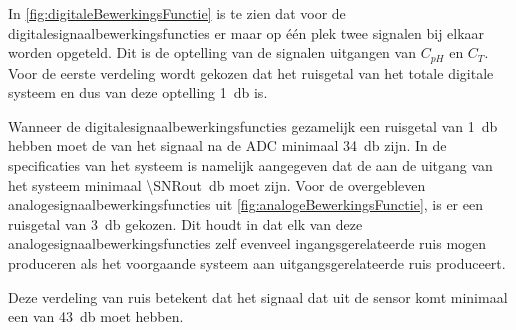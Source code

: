 In \cref{fig:digitaleBewerkingsFunctie} is te zien dat voor de digitalesignaalbewerkingsfuncties er maar op één plek twee signalen bij elkaar worden opgeteld. Dit is de optelling van de signalen uitgangen van $C_{pH}$ en $C_T$. Voor de eerste verdeling wordt gekozen dat het ruisgetal van het totale digitale systeem en dus van deze optelling \qty{1}{\decibel} is.

Wanneer de digitalesignaalbewerkingsfuncties gezamelijk een ruisgetal van \qty{1}{\decibel} hebben moet de \SNR van het signaal na de ADC minimaal \qty{34}{\decibel} zijn. In de specificaties van het systeem is namelijk aangegeven dat de \SNR aan de uitgang van het systeem minimaal \qty{\SNRout}{\decibel} moet zijn. Voor de overgebleven analogesignaalbewerkingsfuncties uit \cref{fig:analogeBewerkingsFunctie}, is er een ruisgetal van \qty{3}{\decibel} gekozen. Dit houdt in dat elk van deze analogesignaalbewerkingsfuncties zelf evenveel ingangsgerelateerde ruis mogen produceren als het voorgaande systeem aan uitgangsgerelateerde ruis produceert.

Deze verdeling van ruis betekent dat het signaal dat uit de sensor komt minimaal een \SNR van \qty{43}{\decibel} moet hebben.






% 







%
